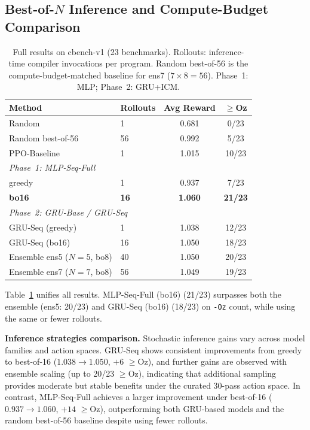 \documentclass{article}
\begin{document}
\subsection{Best-of-$N$ Inference and Compute-Budget Comparison}

\begin{table}[h]
  \caption{Full results on cbench-v1 (23 benchmarks).
           Rollouts: inference-time compiler invocations per program.
           Random best-of-56 is the compute-budget-matched baseline for
           ens7 ($7{\times}8{=}56$).  Phase~1: MLP; Phase~2: GRU+ICM.}
  \label{tab:main}
  \centering
  \begin{tabular}{llcc}
    \toprule
    Method & Rollouts & Avg Reward & $\geq$Oz \\
    \midrule
    Random                  &  1 & 0.681 &  0/23 \\
    Random best-of-56                  & 56 & 0.992 &  5/23 \\
    PPO-Baseline                  &  1 & 1.015 & 10/23 \\
    \midrule
    \multicolumn{4}{l}{\textit{Phase~1: MLP-Seq-Full}} \\
    \quad greedy                       &  1 & 0.937 &  7/23 \\
    \quad \textbf{bo16}                & \textbf{16} &
      \textbf{1.060} & \textbf{21/23} \\
    \midrule
    \multicolumn{4}{l}{\textit{Phase~2: GRU-Base / GRU-Seq}} \\
    \quad GRU-Seq (greedy)   &  1 & 1.038 & 12/23 \\
    \quad GRU-Seq (bo16)                      & 16 & 1.050 & 18/23 \\
    \quad Ensemble ens5 ($N{=}5$, bo8) & 40 & 1.050 & 20/23 \\
    \quad Ensemble ens7 ($N{=}7$, bo8) & 56 & 1.049 & 19/23 \\
    \bottomrule
  \end{tabular}
\end{table}

Table~\ref{tab:main} unifies all results.
MLP-Seq-Full (bo16) (21/23) surpasses both the ensemble (ens5: 20/23) and GRU-Seq (bo16)
(18/23) on \texttt{-Oz} count, while using the same or fewer rollouts.

\textbf{Inference strategies comparison.} Stochastic inference gains vary across model families and action spaces. GRU-Seq shows consistent improvements from greedy to best-of-16 ($1.038 \rightarrow 1.050$, $+6$ $\geq$Oz), and further gains are observed with ensemble scaling (up to 20/23 $\geq$Oz), indicating that additional sampling provides moderate but stable benefits under the curated 30-pass action space. In contrast, MLP-Seq-Full achieves a larger improvement under best-of-16 ($0.937 \rightarrow 1.060$, $+14$ $\geq$Oz), outperforming both GRU-based models and the random best-of-56 baseline despite using fewer rollouts. 
\end{document}
